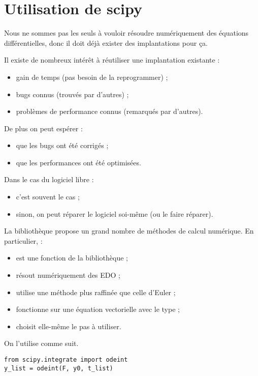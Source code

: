 \section{Utilisation de scipy}

Nous ne sommes pas les seuls à vouloir résoudre numériquement des
équations différentielles, donc il doit déjà exister des implantations
pour ça.

Il existe de nombreux intérêt à réutiliser une implantation existante :
\begin{itemize}
\item gain de temps (pas besoin de la reprogrammer) ;
\item bugs connus (trouvés par d'autres) ;
\item problèmes de performance connus (remarqués par d'autres).
\end{itemize}


De plus on peut espérer :
\begin{itemize}
\item que les bugs ont été corrigés ;
\item que les performances ont été optimisées.
\end{itemize}

Dans le cas du logiciel libre :
\begin{itemize}
\item c'est souvent le cas ; 
\item sinon, on peut réparer le logiciel soi-même (ou le faire réparer).
\end{itemize}

La bibliothèque  propose un grand nombre de méthodes de calcul numérique. En particulier,  :
\begin{itemize}
\item est une fonction de la bibliothèque  ;
\item résout numériquement des EDO ;
\item utilise une méthode plus raffinée que celle d'Euler ;
\item fonctionne sur une équation vectorielle avec le type  ;
\item choisit elle-même le pas à utiliser.
\end{itemize}

On l'utilise comme suit.
\begin{lstlisting}
from scipy.integrate import odeint
y_list = odeint(F, y0, t_list)
\end{lstlisting}


